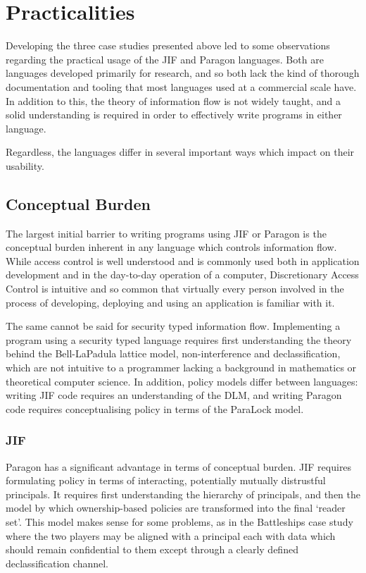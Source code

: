 \section{Practicalities} \label{sect_practicalities}

Developing the three case studies presented above led to some observations regarding the practical usage of the JIF and Paragon languages. Both are languages developed primarily for research, and so both lack the kind of thorough documentation and tooling that most languages used at a commercial scale have. In addition to this, the theory of information flow is not widely taught, and a solid understanding is required in order to effectively write programs in either language.

Regardless, the languages differ in several important ways which impact on their usability.

\subsection{Conceptual Burden}

The largest initial barrier to writing programs using JIF or Paragon is the conceptual burden inherent in any language which controls information flow. While access control is well understood and is commonly used both in application development and in the day-to-day operation of a computer, Discretionary Access Control is intuitive and so common that virtually every person involved in the process of developing, deploying and using an application is familiar with it.

The same cannot be said for security typed information flow. Implementing a program using a security typed language requires first understanding the theory behind the Bell-LaPadula lattice model, non-interference and declassification, which are not intuitive to a programmer lacking a background in mathematics or theoretical computer science. In addition, policy models differ between languages: writing JIF code requires an understanding of the DLM, and writing Paragon code requires conceptualising policy in terms of the ParaLock model.

\subsubsection{JIF}

Paragon has a significant advantage in terms of conceptual burden. JIF requires formulating policy in terms of interacting, potentially mutually distrustful principals. It requires first understanding the hierarchy of principals, and then the model by which ownership-based policies are transformed into the final `reader set'. This model makes sense for some problems, as in the Battleships case study where the two players may be aligned with a principal each with data which should remain confidential to them except through a clearly defined declassification channel.

